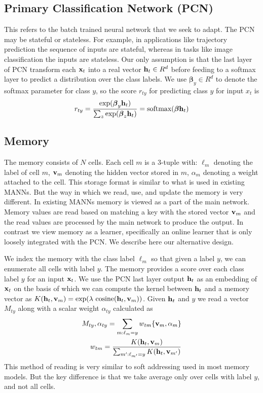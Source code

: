 \documentclass[letterpaper]{article} %
\newcommand{\vek}[1]{{\bf {#1}}}
\newcommand{\vx}{{\vek{x}}}
\newcommand{\vh}{{\vek{h}}}
\newcommand{\vM}{{\vek{v}}}
\newcommand{\util}{{\alpha}}
\newcommand{\vbeta}{{\boldsymbol{\beta}}}
\begin{document}
\subsection{Primary Classification Network (PCN)}
This refers to the batch trained neural network that we seek to adapt.
The PCN may be stateful or stateless.  For example, in applications like trajectory prediction the sequence of inputs are stateful, whereas in tasks like image classification the inputs are stateless.
Our only assumption is that the last layer of PCN transform each $\vx_t$ into a real vector $\vh_t \in R^d$ before feeding to a softmax layer to predict a distribution over the class labels.
We use $\vbeta_y \in R^d$ to denote the softmax parameter for class $y$, so the score  $r_{ty}$ for predicting class $y$ for input $x_t$ is
\begin{equation}
\label{eq-pcn}
\begin{split}
r_{ty} = \frac{\exp(\vbeta_y \vh_t)}{\sum_{z}\exp(\vbeta_z \vh_t)} = \text{softmax}(\vbeta \vh_t)
\end{split}
\end{equation}


\subsection{Memory}
The memory consists of $N$ cells. Each cell $m$  is a 3-tuple with:
$\ell_m$ denoting the label of cell $m$,
$\vM_m$ denoting the hidden vector stored in $m$,
$\util_m$ denoting a weight attached to the cell.  This storage format is similar to what is used in existing MANNs.  But the way in which we read, use, and update the memory is very different.  In existing MANNs memory is viewed as a part of the main network.  Memory values are read based on matching a key with the stored vector $\vM_m$ and the read values are processed by the main network to produce the output.  In contrast we view memory as a learner, specifically an online learner that is only loosely integrated with the PCN. We describe here our alternative design.


We index the memory with the class label $\ell_m$  so that given a label $y$, we can enumerate all cells with label $y$.  The memory provides a score over each class label $y$ for an input $\vx_t$.
We use the PCN last layer output $\vh_t$ as an embedding of $\vx_t$ on the basis of which we can compute the kernel  between $\vh_t$ and a memory vector as  $K(\vh_t,\vM_m) = \exp(\lambda ~\text{cosine}(\vh_t,\vM_m))$.
Given $\vh_t$ and $y$ we read a vector $M_{ty}$ along with a scalar weight $\alpha_{ty}$ calculated as
\begin{equation}
\label{eq-mem-read}
\begin{split}
M_{ty},\alpha_{ty} = \sum_{m:\ell_m = y} w_{tm}\{\vM_m,\util_m\} \\
w_{tm} =  \frac{K(\vh_t,\vM_m)}{\sum_{m': \ell_{m'} = y} K(\vh_t,\vM_{m'}) }
\end{split}
\end{equation}
This method of reading is very similar to soft addressing used in most memory models.  But the key difference is that we take average only over cells with label $y$, and not all cells.
\end{document}
